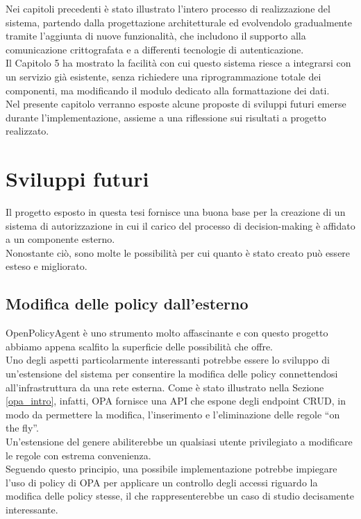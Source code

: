Nei capitoli precedenti è stato illustrato l'intero processo di realizzazione del sistema, partendo dalla
progettazione architetturale ed evolvendolo gradualmente tramite l'aggiunta di nuove funzionalità, che includono il supporto alla comunicazione crittografata 
e a differenti tecnologie di autenticazione. 
\\ Il Capitolo 5 ha mostrato la facilità 
con cui questo sistema riesce a integrarsi con un servizio già esistente, senza richiedere una 
riprogrammazione totale dei componenti, ma modificando il modulo dedicato alla formattazione dei dati. 
\\ Nel presente capitolo verranno esposte alcune proposte di sviluppi futuri emerse durante l'implementazione, assieme a una riflessione
 sui risultati a progetto realizzato. 

\section{Sviluppi futuri}
Il progetto esposto in questa tesi fornisce una buona base per la creazione di un sistema di autorizzazione 
in cui il carico del processo di decision-making è affidato a un componente esterno.  
\\ Nonostante ciò, sono molte le possibilità per cui quanto è stato creato può essere esteso e migliorato. 

\subsection{Modifica delle policy dall'esterno}
OpenPolicyAgent è uno strumento molto affascinante e con questo progetto abbiamo 
appena scalfito la superficie delle possibilità che offre. \\ Uno degli aspetti particolarmente interessanti 
potrebbe essere lo sviluppo di un'estensione del sistema per consentire la modifica delle policy connettendosi all'infrastruttura da una rete esterna. 
Come è stato illustrato nella Sezione \ref*{opa_intro}, infatti, OPA fornisce una API che espone degli 
endpoint CRUD, in modo da permettere la modifica, l'inserimento e l'eliminazione delle regole ``on the fly''.
\\Un'estensione del genere abiliterebbe un qualsiasi utente privilegiato a modificare le regole con estrema
 convenienza.   
\\ Seguendo questo principio, una possibile implementazione potrebbe impiegare l'uso di policy di OPA per applicare un controllo degli accessi 
riguardo la modifica delle policy stesse, il che rappresenterebbe un caso di studio decisamente interessante. 

